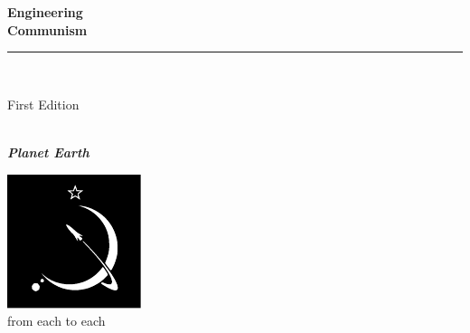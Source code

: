 \documentclass{book}
\makeatletter
\newcommand{\booksubtitle}{On Mining Engineering}
\newcommand{\authorsubtitle}{Planet Earth}
\newcommand{\bookauthor}{\@author}
\makeatother
\begin{document}
\begin{titlepage}
\begin{flushleft}

\textbf{\fontsize{48}{54}\selectfont Engineering\\Communism\\}

\par\noindent\rule{\textwidth}{4pt}\\


\begin{flushright}
\Large First Edition
\end{flushright}

\vspace{\fill}

\textbf{\large \bookauthor}\\[3.5pt]
\textbf{\large \textit{\authorsubtitle}}

\vspace{\fill}

\begin{center}
\includegraphics{graphics/logo.pdf}\\[4pt]
\small{from each to each}
\end{center}

\end{flushleft}
\end{titlepage}
\restoregeometry
\end{document}
